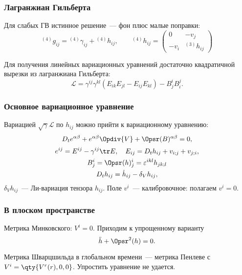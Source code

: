 \documentclass[compress]{beamer}
\begin{document}
    \begin{frame}\frametitle{Лагранжиан Гильберта}

        Для слабых ГВ истинное решение~--- фон плюс малые поправки:
        \begin{equation*}
            {}^{(4)}g_{ij} = {}^{(4)}\gamma_{ij} + {}^{(4)}h_{ij}, \qquad
            {}^{(4)}h_{ij} = \begin{pmatrix}
                0    & - v_j          \\
                -v_i & {}^{(3)}h_{ij}
            \end{pmatrix}
        \end{equation*}

        Для получения линейных вариационных уравнений достаточно квадратичной вырезки из лагранжиана Гильберта:
        \begin{equation}
            \mathcal{L} = \gamma^{ij}\gamma^{kl} (E_{ik}E_{jl} - E_{ij}E_{kl}) - B^i_j B_i^j .
        \end{equation}

    \end{frame}

    \begin{frame}\frametitle{Основное вариационное уравнение}

        Вариацией $\sqrt{\gamma} \mathcal{L}$ по $h_{ij}$ можно прийти к вариационному уравнению:
        \begin{equation}
            D_t{e^{\alpha\beta}} + e^{\alpha\beta} \Opdiv{V} + \Opsr(B)^{\alpha\beta} = 0,
        \end{equation}
        \begin{gather*}
            e^{ij} = E^{ij} - \gamma^{ij} \tr E, \quad
            E_{ij} = D_t{h_{ij}} + v_{i;j} + v_{j;i}, \\
            B^i_j = \Opsr(h)^i_j = \varepsilon^{ikl} h_{jk;l} \\
            D_t{h_{ij}} = \dot{h}_{ij} - \delta_V h_{ij} ,
        \end{gather*}
        $\delta_V h_{ij}$~--- Ли-вариация тензора $h_{ij}$. Поле $v^i$~--- калибровочное: полагаем $v^i = 0$.

    \end{frame}

    \begin{frame}\frametitle{В плоском пространстве}

        Метрика Минковского: $V^i = 0$. Приходим к упрощенному варианту
        \begin{equation}
            \ddot{h} + \Opsr^2(h) = 0 .
        \end{equation}

        Метрика Шварцшильда в глобальном времени~--- метрика Пенлеве с $V^i = \qty{ V^r(r), 0, 0 }$. Упростить уравнение не удается.

    \end{frame}
\end{document}
